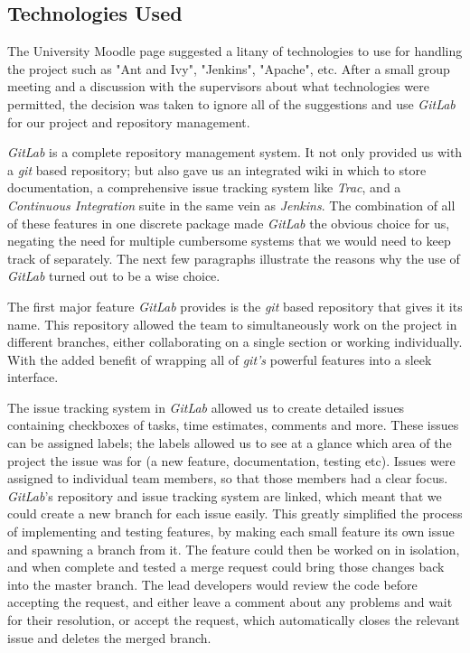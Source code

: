 \documentclass{l3proj}
\begin{document}
\subsection{Technologies Used}
\label{sec:tech}

The University Moodle page suggested a litany of technologies  to use for handling the project such as "Ant and Ivy", "Jenkins", "Apache", etc. After a small group meeting and a discussion with the supervisors about what technologies were permitted, the decision was taken to ignore all of the suggestions and use \textit{GitLab} \cite{gitlab-about} for our project and repository management.

\textit{GitLab} is a complete repository management system. It not only provided us with a \textit{git} based repository; but also gave us an integrated wiki in which to store documentation, a comprehensive issue tracking system like \textit{Trac}, and a \textit{Continuous Integration} suite in the same vein as \textit{Jenkins}. The combination of all of these features in one discrete package made \textit{GitLab} the obvious choice for us, negating the need for multiple cumbersome systems that we would need to keep track of separately. The next few paragraphs illustrate the reasons why the use of \textit{GitLab} turned out to be a wise choice.

The first major feature \textit{GitLab} provides is the \textit{git} based repository that gives it its name. This repository allowed the team to simultaneously work on the project in different branches, either collaborating on a single section or working individually. With the added benefit of wrapping all of \textit{git's} powerful features into a sleek interface.

The issue tracking system in \textit{GitLab} allowed us to create detailed issues containing checkboxes of tasks, time estimates, comments and more. These issues can be assigned labels; the labels allowed us to see at a glance which area of the project the issue was for (a new feature, documentation, testing etc). Issues were assigned to individual team members, so that those members had a clear focus. \textit{GitLab}'s repository and issue tracking system are linked, which meant that we could create a new branch for each issue easily. This greatly simplified the process of implementing and testing features, by making each small feature its own issue and spawning a branch from it. The feature could then be worked on in isolation, and when complete and tested a merge request could bring those changes back into the master branch. The lead developers would review the code before accepting the request, and either leave a comment about any problems and wait for their resolution, or accept the request, which automatically closes the relevant issue and deletes the merged branch.
\end{document}
